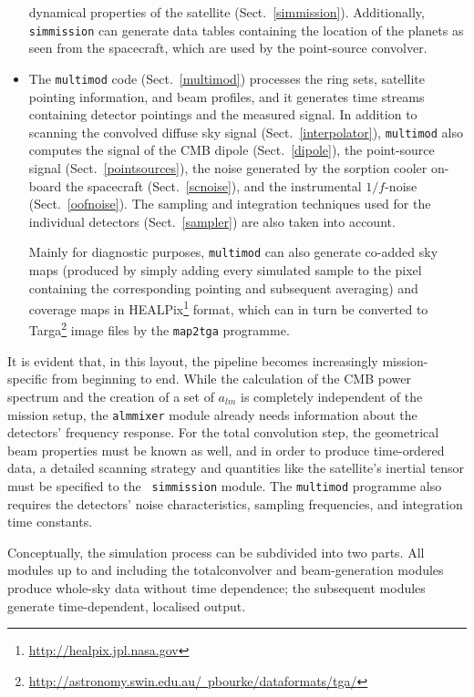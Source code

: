 \documentclass{aa}
\begin{document}
\begin{itemize}
    dynamical properties of the satellite (Sect.~\ref{simmission}).
    Additionally, {\tt simmission} can generate
    data tables containing the location of the planets as seen from
    the spacecraft, which are used by the point-source convolver.
  \item The {\tt multimod} code (Sect.~\ref{multimod}) processes the
    ring sets, satellite pointing information, and beam profiles, and it
    generates time streams containing detector pointings and the
    measured signal. In addition to scanning the convolved diffuse sky
    signal (Sect.~\ref{interpolator}), {\tt multimod} also computes
    the signal of the CMB dipole (Sect.~\ref{dipole}), the
    point-source signal (Sect.~\ref{pointsources}), the noise
    generated by the sorption cooler on-board the spacecraft
    (Sect.~\ref{scnoise}), and the instrumental $1/f$-noise
    (Sect.~\ref{oofnoise}). The sampling and integration techniques used for
    the individual detectors (Sect.~\ref{sampler}) are also taken
    into account.

    Mainly for diagnostic purposes, {\tt multimod} can also generate
    co-added sky maps (produced by simply adding every simulated
    sample to the pixel containing the corresponding pointing and subsequent
    averaging) and coverage maps in
    HEALPix\footnote{\href{http://healpix.jpl.nasa.gov}
    {http://healpix.jpl.nasa.gov}} format, which can in turn
    be converted to Targa\footnote{\href{http://astronomy.swin.edu.au/~pbourke/dataformats/tga/}{http://astronomy.swin.edu.au/~pbourke/dataformats/tga/}} image files by the {\tt map2tga} programme.
\end{itemize}

It is evident that, in this layout, the pipeline becomes increasingly
mission-specific from beginning to end. While the calculation of the
CMB power spectrum and the creation of a set of $a_{lm}$
is completely independent of the mission setup,
the {\tt almmixer} module already needs information about the
detectors' frequency response. For the total convolution step, the
geometrical beam properties must be known as well, and in order to
produce time-ordered data, a detailed scanning strategy and quantities
like the satellite's inertial tensor must be specified to the {\tt
simmission} module. The {\tt multimod} programme also requires
the detectors' noise characteristics, sampling frequencies, and
integration time constants.

Conceptually, the simulation process can be subdivided into two
parts. All modules up to and including the totalconvolver and
beam-generation modules produce whole-sky data without time
dependence; the subsequent modules generate time-dependent, localised
output.
\end{document}
